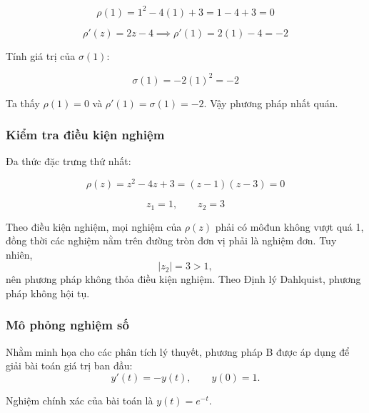 $$ \rho(1) = 1^2 - 4(1) + 3 = 1 - 4 + 3 = 0 $$

$$ \rho'(z) = 2z - 4 \implies \rho'(1) = 2(1) - 4 = -2 $$

Tính giá trị của $\sigma(1)$:

$$ \sigma(1) = -2(1)^2 = -2 $$

Ta thấy $\rho(1) = 0$ và $\rho'(1) = \sigma(1) = -2$. Vậy phương pháp nhất quán.

\vspace{0.5cm}
\subsubsection*{Kiểm tra điều kiện nghiệm}

Đa thức đặc trưng thứ nhất:

\[
    \rho(z) = z^2 - 4z + 3 = (z - 1)(z - 3) = 0
\]  

\[
    z_1 = 1, \qquad z_2 = 3
\] 

Theo điều kiện nghiệm, mọi nghiệm của $\rho(z)$ phải có môđun không vượt quá 1, đồng thời các nghiệm nằm trên đường tròn đơn vị phải là nghiệm đơn. Tuy nhiên,
\[
|z_2| = 3 > 1, 
\]
nên phương pháp không thỏa điều kiện nghiệm. Theo Định lý Dahlquist, phương pháp không hội tụ.

\subsubsection*{Mô phỏng nghiệm số}

Nhằm minh họa cho các phân tích lý thuyết, phương pháp B được áp dụng để giải bài toán giá trị ban đầu:
\[
y'(t) = -y(t),\qquad y(0) = 1.
\]

Nghiệm chính xác của bài toán là $y(t) = e^{-t}$.

